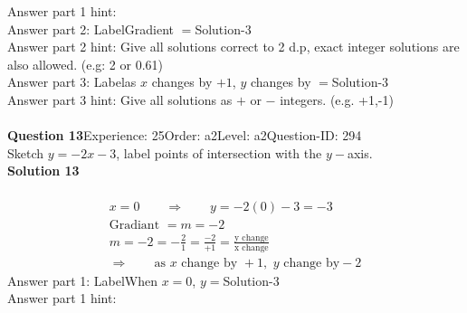\documentclass{article}
\begin{document}
Answer part 1 hint: \hspace{15pt}\\
Answer part 2: \hspace{10pt}Label\hspace{10pt}Gradient $=$\hspace{10pt}Solution\hspace{10pt}-3\\
Answer part 2 hint: \hspace{15pt}Give all solutions correct to 2 d.p, exact integer solutions are also allowed. (e.g: 2 or 0.61)\\
Answer part 3: \hspace{10pt}Label\hspace{10pt}as $x$ changes by $+1$, $y$ changes by $=$\hspace{10pt}Solution\hspace{10pt}-3\\
Answer part 3 hint: \hspace{15pt}Give all solutions as $+$ or $-$ integers. (e.g. +1,-1)\\
\\[4pt]
\noindent\textbf{Question 13}\hspace{20pt}Experience: 25\hspace{20pt}Order: a2\hspace{20pt}Level: a2\hspace{20pt}Question-ID: 294\\[2pt]
Sketch $y=-2x-3$, label points of intersection with the $y-$axis.\\[4pt]
\noindent\textbf{Solution 13}\\[2pt]
\\[-35pt]\begin{align*}
&x=0\qquad\Rightarrow\qquad y=-2(0)-3=-3&\\[2pt]
&\text{Gradiant}\,\,=m=-2&\\[2pt]
&m=-2=-\displaystyle\frac{2}{1}=\displaystyle\frac{-2}{+1}=\displaystyle\frac{\text{y change}}{\text{x change}}&\\[2pt]
& \Rightarrow\qquad \text{as}\,\, x \,\,\text{change by } +1,\,\, y\,\, \text{change by} -2 &
\end{align*}
Answer part 1: \hspace{10pt}Label\hspace{10pt}When $x=0$, $y=$\hspace{10pt}Solution\hspace{10pt}-3\\
Answer part 1 hint: \hspace{15pt}\\
\end{document}
